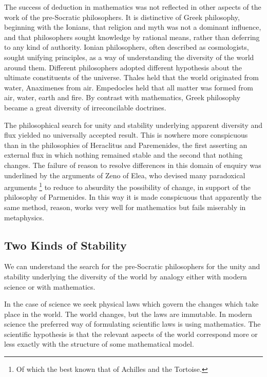 The success of deduction in mathematics was not reflected in other
aspects of the work of the pre-Socratic philosophers.
It is distinctive of Greek philosophy, beginning with the Ionians,
that religion and myth was not a dominant influence, and that
philosophers sought knowledge by rational means, rather than deferring
to any kind of authority.
Ionian philosophers, often described as cosmologists, sought unifying
principles, as a way of understanding the diversity of the world
around them. 
Different philosophers adopted different hypothesis about the ultimate
constituents of the universe.
Thales held that the world originated from water, Anaximenes from air.
Empedocles held that all matter was formed from air, water, earth and
fire.
By contrast with mathematics, Greek philosophy became a great
diversity of irreconcilable doctrines.

The philosophical search for unity and stability underlying apparent
diversity and flux yielded no universally accepted result.
This is nowhere more conspicuous than in the philosophies of
Heraclitus and Paremenides, the
first asserting an external flux in which nothing remained stable and
the second that nothing changes. 
The failure of reason to resolve differences in this domain of enquiry
was underlined by the arguments of Zeno of Elea,
who devised many paradoxical arguments%
\footnote{Of which the best known that of Achilles and the Tortoise.}%
 to reduce to absurdity the possibility of change, in support of the
 philosophy of Parmenides.
In this way it is made conspicuous that apparently the same method,
reason, works very well for mathematics but fails miserably in
metaphysics.

\subsection{Two Kinds of Stability}

We can understand the search for the pre-Socratic philosophers for the
unity and stability underlying the diversity of the world by analogy
either with modern science or with mathematics.

In the case of science we seek physical laws which govern the changes
which take place in the world.
The world changes, but the laws are immutable.
In modern science the preferred way of formulating scientific laws is
using mathematics.
The scientific hypothesis is that the relevant aspects of the world
correspond more or less exactly with the structure of some
mathematical model.

